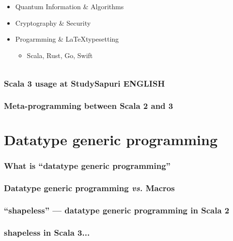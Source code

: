 \begin{frame}
\begin{columns}
\begin{column}{0.7\textwidth}
\begin{itemize}
        \item Quantum Information \& Algorithms

        \item Cryptography \& Security
        
        \item Progarmming \& \LaTeX typesetting
        \begin{itemize}
          \item Scala, Rust, Go, Swift
        \end{itemize}
      \end{itemize}
    \end{column}
  \end{columns}
\end{frame}

\begin{frame}
  \frametitle{Scala 3 usage at StudySapuri ENGLISH}
\end{frame}

\begin{frame}
  \frametitle{Meta-programming between Scala 2 and 3}
\end{frame}

\section{Datatype generic programming}

\begin{frame}
  \frametitle{What is ``datatype generic programming''}
\end{frame}

\begin{frame}
  \frametitle{Datatype generic programming \textit{vs.} Macros}
\end{frame}

\begin{frame}
  \frametitle{``shapeless'' --- datatype generic programming in Scala 2}
\end{frame}

\begin{frame}
  \frametitle{shapeless in Scala 3...}
\end{frame}



